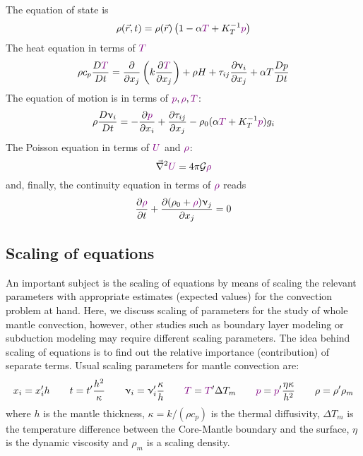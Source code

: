 The equation of state is
\begin{equation}
\rho(\vec{r},t) = \rho(\vec{r}) \left(1-\alpha {\color{violet} T} + K_T^{-1} {\color{violet}p} \right) 
\label{eq:md71a}
\end{equation}
The heat equation in terms of ${\color{violet}T}$
\begin{equation}
\rho c_p \frac{D {\color{violet} T}}{Dt} = \frac{\partial }{\partial x_j} 
\left( k \frac{\partial {\color{violet}T}}{\partial x_j}  \right)
+ \rho H + \tau_{ij}\frac{\partial \upnu_i}{\partial x_j} + \alpha T \frac{Dp}{Dt}
\label{eq:md71b}
\end{equation}
The equation of motion is in terms of ${\color{violet}p},{\color{violet}\rho},{\color{violet}T}$:
\begin{equation}
\rho \frac{D \upnu_i}{Dt} = -\frac{\partial {\color{violet}p}}{\partial x_i}
+\frac{\partial \tau_{ij}}{\partial x_j}
-\rho_0 (\alpha {\color{violet} T} + K_T^{-1} {\color{violet}p}) g_i
\label{eq:md71c}
\end{equation}
The Poisson equation in terms of ${\color{violet}U}$ and ${\color{violet}\rho}$:
\begin{equation}
\vec\nabla^2 {\color{violet} U} = 4 \pi {\cal G} {\color{violet} \rho}
\label{eq:md71d}
\end{equation}
and, finally, the continuity equation in terms of ${\color{violet}\rho}$ reads
\begin{equation}
\frac{\partial {\color{violet}\rho} }{\partial t} + 
\frac{\partial (\rho_0 + {\color{violet}\rho}) \upnu_j }{\partial x_j} =0
\label{eq:md71e}
\end{equation}



\subsection{Scaling of equations}


An important subject is the scaling of equations by means of scaling the relevant
parameters with appropriate estimates (expected values) for the convection problem at
hand. Here, we discuss scaling of parameters for the study of whole mantle convection,
however, other studies such as boundary layer modeling or subduction modeling may
require different scaling parameters. The idea behind scaling of equations is to find out
the relative importance (contribution) of separate terms. Usual scaling parameters for
mantle convection are:
\[
x_i = x_i' h
\qquad
t = t' \frac{h^2}{\kappa}
\qquad
\upnu_i = \upnu_i' \frac{\kappa}{h} 
\qquad
{\color{violet} T} = {\color{violet} T}' \Delta T_m
\qquad
{\color{violet} p} = {\color{violet} p}' \frac{\eta \kappa}{h^2}
\qquad
\rho = \rho' \rho_m 
\]
where $h$ is the mantle thickness, $\kappa=k/(\rho c_p)$
is the thermal diffusivity, $\Delta T_m$ is the
temperature difference between the Core-Mantle boundary and the surface,
$\eta$ is the dynamic viscosity and $\rho_m$ is a scaling density.

